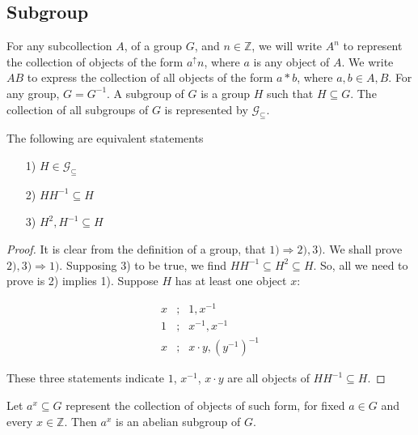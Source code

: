 \documentclass [12pt]{book}
\begin{document}
		\subsection{Subgroup}

For any subcollection $A$, of a group $G$, and $n\in \mathbb{Z}$, we will write $A^{n}$ to represent the collection of objects of the form $a^{\uparrow}n$, where $a$ is any object of $A$. We write $AB$ to express the collection of all objects of the form $a*b$, where $a,b\in A,B$. For any group, $G=G^{-1}$. A subgroup of $G$ is a group $H$ such that $H\subseteq G$. The collection of all subgroups of $G$ is represented by $\mathcal{G}_{\subseteq}$.

\begin{theorem}The following are equivalent statements\begin{itemize}\item[1)] $H\in \mathcal{G}_{\subseteq}$\item[2)]$HH^{-1}\subseteq H$\item[3)]$H^{2},H^{-1}\subseteq H$\end{itemize}\end{theorem}

\begin{proof}It is clear from the definition of a group, that $1)\Rightarrow2),3)$. We shall prove $2),3)\Rightarrow1)$. Supposing 3) to be true, we find $HH^{-1}\subseteq H^2\subseteq H$. So, all we need to prove is 2) implies 1). Suppose $H$ has at least one object $x$:

\begin{eqnarray}\nonumber x&;&1,x^{-1}\\\nonumber1&;&x^{-1},x^{-1} \\\nonumber x&;&x\cdot y,(y^{-1})^{-1}\end{eqnarray}

These three statements indicate $1$, $x^{-1}$, $x\cdot y$ are all objects of $HH^{-1}\subseteq H$.

\end{proof}

\begin{theorem}Let $a^{x}\subseteq G$ represent the collection of objects of such form, for fixed $a\in G$ and every $x\in\mathbb{Z}$. Then $a^{x}$ is an abelian subgroup of $G$.

\end{theorem}
\end{document}
